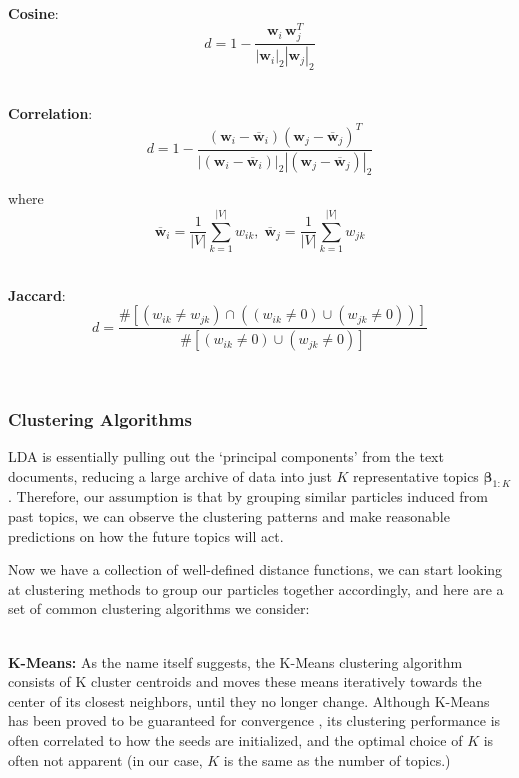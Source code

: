 \documentclass[conference]{IEEEtran}
\begin{document}
\-\\
\textbf{Cosine}: 
\begin{equation*}
d = 1 - \frac{\mathbf{w}_i\,\mathbf{w}_j^T}{|\mathbf{w}_i|_2|\mathbf{w}_j|_2}
\end{equation*}

\-\\
\textbf{Correlation}: 
\begin{equation*}
d = 1 - \frac{(\mathbf{w}_i - \overline{\mathbf{w}}_i)(\mathbf{w}_j - \overline{\mathbf{w}}_j)^T}{|(\mathbf{w}_i - \overline{\mathbf{w}}_i)|_2|(\mathbf{w}_j - \overline{\mathbf{w}}_j)|_2}
\end{equation*}

where 
\begin{equation*}
	\overline{\mathbf{w}}_i = \frac{1}{|V|}\sum_{k=1}^{|V|}w_{ik},\;
	\overline{\mathbf{w}}_j = \frac{1}{|V|}\sum_{k=1}^{|V|}w_{jk}
\end{equation*}

\-\\
\textbf{Jaccard}: 
\begin{equation*}
	d = \frac{\# \left[(w_{ik} \neq w_{jk})\cap((w_{ik} \neq 0)\cup(w_{jk} \neq 0))\right]}{\#\left[(w_{ik} \neq 0)\cup(w_{jk} \neq 0)\right]}
\end{equation*}

\-\\

\subsubsection{Clustering Algorithms}
LDA is essentially pulling out the `principal components' from the text documents, reducing a large archive of data into just $K$ representative topics $\mathbf{\beta}_{1:K}$. Therefore, our assumption is that by grouping similar particles induced from past topics, we can observe the clustering patterns and make reasonable predictions on how the future topics will act.

Now we have a collection of well-defined distance functions, we can start looking at clustering methods to group our particles together accordingly, and here are a set of common clustering algorithms we consider:

\-\\
\textbf{K-Means:} As the name itself suggests, the K-Means clustering algorithm consists of K cluster centroids and moves these means iteratively towards the center of its closest neighbors, until they no longer change. Although K-Means has been proved to be guaranteed for convergence \cite{selim1984}, its clustering performance is often correlated to how the seeds are initialized, and the optimal choice of $K$ is often not apparent (in our case, $K$ is the same as the number of topics.)
\end{document}
